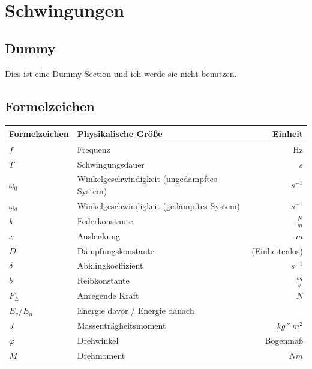 \documentclass[12pt, a4paper]{scrreprt}
\begin{document}

\tableofcontents
\listoffigures
\newpage
\linespread{1.5} %


\chapter{Schwingungen}

\section{Dummy}
Dies ist eine Dummy-Section und ich werde sie nicht benutzen.

\section{Formelzeichen}

\begin{center}
  \makegapedcells
  \begin{tabular}{l | l | r}
    Formelzeichen & Physikalische Größe & Einheit\\
    \hline \hline
    \(f\) & Frequenz & Hz\\ \hline
    \(T\) & Schwingungsdauer & \(s\)\\ \hline
    \(\omega _0\) & Winkelgeschwindigkeit (ungedämpftes System) & \(s^{-1}\)\\ \hline
    \(\omega _d\) & Winkelgeschwindigkeit (gedämpftes System) & \(s^{-1}\)\\ \hline
    \(k\) & Federkonstante & \(\frac{N}{m}\)\\ \hline
    \(x\) & Auslenkung & \(m\)\\ \hline
    \(D\) & Dämpfungskonstante & (Einheitenlos)\\ \hline
    \(\delta\) & Abklingkoeffizient & \(s^{-1}\)\\ \hline
    \(b\) & Reibkonstante & \(\frac{kg}{s}\)\\ \hline
    \(F_E\) & Anregende Kraft & \(N\)\\ \hline
    \(E_v/E_n\) & Energie davor / Energie danach\\ \hline
    \(J\) & Massenträgheitsmoment & \(kg*m^2\)\\ \hline
    \(\varphi\) & Drehwinkel & Bogenmaß\\ \hline
    \(M\) & Drehmoment & \(Nm\)\\ \hline
  \end{tabular}
\end{center}
\end{document}
